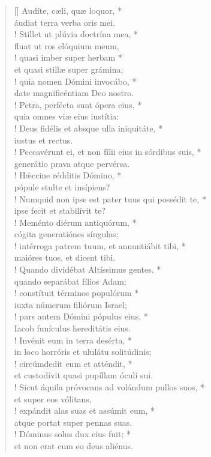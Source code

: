 \begin{verse}[\versewidth]
Audíte, cæli, quæ loquor, *\\
áudiat terra verba oris mei.\\!
\vin Stillet ut plúvia doctrína mea, *\\
\vin fluat ut ros elóquium meum,\\!
quasi imber super herbam *\\
et quasi stillæ super grámina;\\!
\vin quia nomen Dómini invocábo, *\\
\vin date magnificéntiam Deo nostro.\\!
Petra, perfécta sunt ópera eius, *\\
quia omnes viæ eius iustítia:\\!
\vin Deus fidélis et absque ulla iniquitáte, *\\
\vin iustus et rectus.\\!
Peccavérunt ei, et non fílii eius in sórdibus suis, *\\
generátio prava atque pervérsa.\\!
\vin H\'{æ}ccine rédditis Dómino, *\\
\vin pópule stulte et insípiens?\\!
Numquid non ipse est pater tuus qui possédit te, *\\
ipse fecit et stabilívit te?\\!
\vin Meménto diérum antiquórum, *\\
\vin cógita generatiónes síngulas;\\!
intérroga patrem tuum, et annuntiábit tibi, *\\
maióres tuos, et dicent tibi.\\!
\vin Quando dividébat Altíssimus gentes, *\\
\vin quando separábat fílios Adam;\\!
constítuit términos populórum *\\
iuxta númerum filiórum Israel;\\!
\vin pars autem Dómini pópulus eius, *\\
\vin Iacob funículus hereditátis eius.\\!
Invénit eum in terra desérta, *\\
in loco horróris et ululátu solitúdinis;\\!
\vin circúmdedit eum et atténdit, *\\
\vin et custodívit quasi pupíllam óculi sui.\\!
Sicut áquila próvocans ad volándum pullos suos, *\\
et super eos vólitans,\\!
\vin expándit alas suas et assúmit eum, *\\
\vin atque portat super pennas suas.\\!
Dóminus solus dux eius fuit; *\\
et non erat cum eo deus aliénus.\\
\end{verse}
\vspace{1cm}


